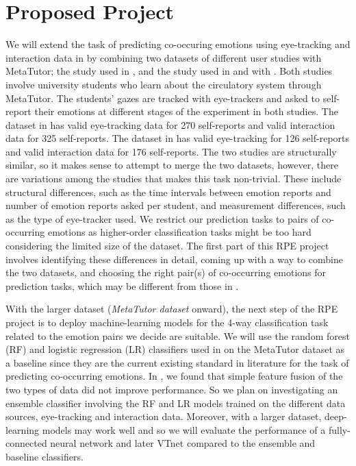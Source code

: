 \documentclass[11pt,letterpaper]{article}
\begin{document}
\section{Proposed Project}
We will extend the task of predicting co-occuring emotions using eye-tracking and interaction data in \autocite{lalle2021predict} by combining two datasets of different user studies with MetaTutor; the study used in \autocite{lalle2018prediction}, and the study used in \autocite{lalle2021predict} and \autocite{jaques2014predicting} with . Both studies involve university students who learn about the circulatory system through MetaTutor. The students' gazes are tracked with eye-trackers and asked to self-report their emotions at different stages of the experiment in both studies. The dataset in \autocite{lalle2021predict} has valid eye-tracking data for 270 self-reports and valid interaction data for 325 self-reports. The dataset in \autocite{lalle2018prediction} has valid eye-tracking for 126 self-reports and valid interaction data for 176 self-reports. The two studies are structurally similar, so it makes sense to attempt to merge the two datasets, however, there are variations among the studies that makes this task non-trivial. These include structural differences, such as the time intervals between emotion reports and number of emotion reports asked per student, and measurement differences, such as the type of eye-tracker used. We restrict our prediction tasks to pairs of co-occurring emotions as higher-order classification tasks might be too hard considering the limited size of the dataset. The first part of this RPE project involves identifying these differences in detail, coming up with a way to combine the two datasets, and choosing the right pair(s) of co-occurring emotions for prediction tasks, which may be different from those in \autocite{lalle2021predict}.

With the larger dataset (\textit{MetaTutor dataset} onward), the next step of the RPE project is to deploy machine-learning models for the 4-way classification task related to the emotion pairs we decide are suitable. We will use the random forest (RF) and logistic regression (LR) classifiers used in \autocite{lalle2021predict} on the MetaTutor dataset as a baseline since they are the current existing standard in literature for the task of predicting co-occurring emotions. In \autocite{lalle2021predict}, we found that simple feature fusion of the two types of data did not improve performance. So we plan on investigating an ensemble classifier involving the RF and LR models trained on the different data sources, eye-tracking and interaction data. Moreover, with a larger dataset, deep-learning models may work well and so we will evaluate the performance of a fully-connected neural network and later VTnet \autocite{sims2020neural} compared to the ensemble and baseline classifiers.
\end{document}
